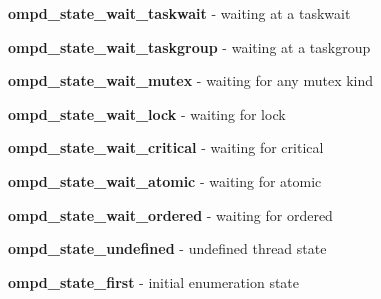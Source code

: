 \label{ompd_state_wait_taskwait}
\textbf{ompd\_state\_wait\_taskwait} - 
waiting at a taskwait

\label{ompd_state_wait_taskgroup}
\textbf{ompd\_state\_wait\_taskgroup} - 
waiting at a taskgroup

\label{ompd_state_wait_mutex}
\textbf{ompd\_state\_wait\_mutex} - 
waiting for any mutex kind

\label{ompd_state_wait_lock}
\textbf{ompd\_state\_wait\_lock} - 
waiting for lock

\label{ompd_state_wait_critical}
\textbf{ompd\_state\_wait\_critical} - 
waiting for critical

\label{ompd_state_wait_atomic}
\textbf{ompd\_state\_wait\_atomic} - 
waiting for atomic

\label{ompd_state_wait_ordered}
\textbf{ompd\_state\_wait\_ordered} - 
waiting for ordered

\label{ompd_state_undefined}
\textbf{ompd\_state\_undefined} - 
undefined thread state

\label{ompd_state_first}
\textbf{ompd\_state\_first} - 
initial enumeration state
